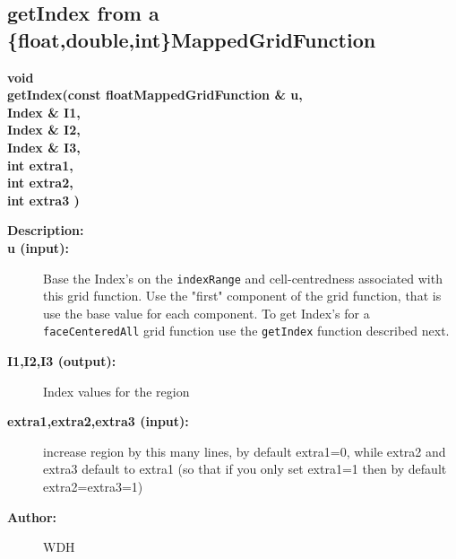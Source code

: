 \subsection{getIndex from a \{float,double,int\}MappedGridFunction}

\begin{flushleft} \textbf{%
void  \\ 
\settowidth{\OGgetIndexIncludeArgIndent}{getIndex(}%
getIndex(const floatMappedGridFunction \& u, \\ 
\hspace{\OGgetIndexIncludeArgIndent}Index \& I1, \\ 
\hspace{\OGgetIndexIncludeArgIndent}Index \& I2, \\ 
\hspace{\OGgetIndexIncludeArgIndent}Index \& I3,\\ 
\hspace{\OGgetIndexIncludeArgIndent}int extra1,\\ 
\hspace{\OGgetIndexIncludeArgIndent}int extra2,\\ 
\hspace{\OGgetIndexIncludeArgIndent}int extra3 )
}\end{flushleft}
\begin{description}
\item[{\bf Description:}] 
\item[{\bf u (input):}]  Base the Index's on the {\tt indexRange} and cell-centredness associated   
     with this grid function. Use the "first" component of the grid function, that is
     use the base value for each component. To get Index's for a {\tt faceCenteredAll} grid function
     use the {\tt getIndex} function described next.
\item[{\bf I1,I2,I3 (output):}]  Index values for the region
\item[{\bf extra1,extra2,extra3 (input):}]  increase region by this many lines, by default extra1=0, while 
                         extra2 and extra3 default to extra1 (so that if you only set extra1=1
                         then by default extra2=extra3=1)
\item[{\bf Author:}]  WDH
\end{description}

